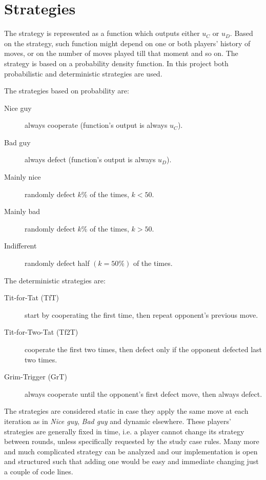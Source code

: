 \documentclass[journal,a4paper,10pt,twoside]{IEEEtran} %
\begin{document}
\section{Strategies} \label{s:str}
The strategy is represented as a function which outputs either $u_C$ or $u_D$. Based on the strategy, such function might depend on one or both players' history of moves, or on the number of moves played till that moment and so on.
The strategy is based on a probability density function. In this project both probabilistic and deterministic strategies are used.

The strategies based on probability are:
\begin{description}
    \item[Nice guy] always cooperate (function's output is always $u_C$).
    \item[Bad guy] always defect (function's output is always $u_D$).
    \item[Mainly nice] randomly defect $k\%$ of the times, $k<50$.%
    \item[Mainly bad] randomly defect $k\%$ of the times, $k>50$.%
    \item[Indifferent] randomly defect half $(k=50\%)$ of the times.
\end{description}

The deterministic strategies are:
\begin{description}
    \item[Tit-for-Tat (TfT)] start by cooperating the first time, then repeat opponent's previous move.
    \item[Tit-for-Two-Tat (Tf2T)] cooperate the first two times, then defect only if the opponent defected last two times.
    \item[Grim-Trigger (GrT)] always cooperate until the opponent's first defect move, then always defect. 
\end{description}

The strategies are considered static in case they apply the same move at each iteration as in \textit{Nice guy}, \textit{Bad guy} and dynamic elsewhere.
These players' strategies are generally fixed in time, i.e. a player cannot change its strategy between rounds, unless specifically requested by the study case rules.%
Many more and much complicated strategy can be analyzed and our implementation is open and structured such that adding one would be easy and immediate changing just a couple of code lines.
\end{document}
